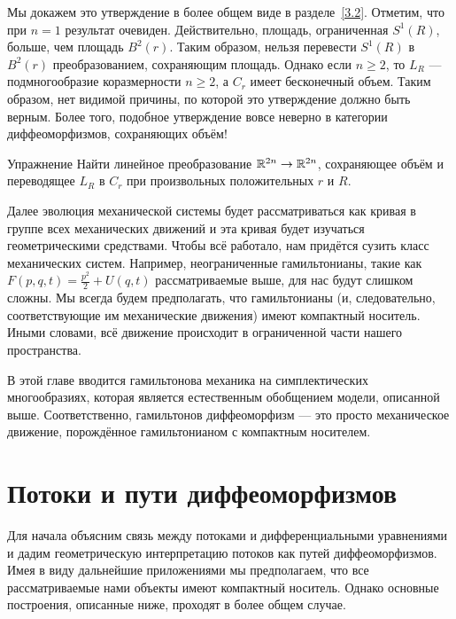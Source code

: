 Мы докажем это утверждение в более общем виде в разделе~\ref{3.2}.
Отметим, что при $n = 1$ результат очевиден.
Действительно, площадь, ограниченная $S^1 (R)$, больше, чем площадь $B^2 (r)$.
Таким образом, нельзя перевести $S^1(R)$ в $B^2(r)$ преобразованием, сохраняющим площадь.
Однако если $n \ge 2$, то $L_R$ — подмногообразие коразмерности $n \ge 2$, а $C_r$ имеет бесконечный объем.
Таким образом, нет видимой причины, по которой это утверждение должно быть верным.
Более того, подобное утверждение вовсе неверно в категории диффеоморфизмов, сохраняющих объём!


\begin{ex*}{Упражнение}
Найти линейное преобразование $\mathbb{R}^{2n} \to \mathbb{R}^{2n}$, сохраняющее объём и переводящее $L_R$ в $C_r$ при произвольных положительных $r$ и $R$.
\end{ex*}

Далее эволюция механической системы будет рассматриваться как кривая в группе всех механических движений и эта кривая будет изучаться геометрическими средствами.
Чтобы всё работало, нам придётся сузить класс механических систем.
Например, неограниченные гамильтонианы, такие как $F(p,q,t) = \tfrac {p^2}2 + U(q,t)$ рассматриваемые выше, для нас будут слишком сложны.
Мы всегда будем предполагать, что гамильтонианы (и, следовательно, соответствующие им механические движения) имеют компактный носитель.
Иными словами, всё движение происходит в ограниченной части нашего пространства.

В этой главе вводится гамильтонова механика на симплектических многообразиях, которая является естественным обобщением модели, описанной выше.
Соответственно, гамильтонов диффеоморфизм — это просто механическое движение, порождённое гамильтонианом с компактным носителем. 

\section{Потоки и пути диффеоморфизмов}

Для начала объясним связь между потоками и дифференциальными уравнениями и дадим геометрическую интерпретацию потоков как путей диффеоморфизмов.
Имея в виду дальнейшие приложениями мы предполагаем, что все рассматриваемые нами объекты имеют компактный носитель.
Однако основные построения, описанные ниже, проходят в более общем случае.

